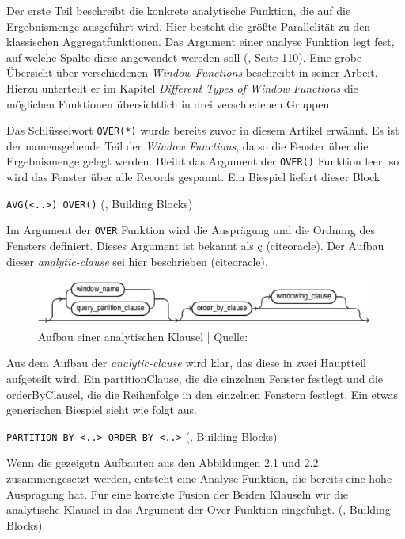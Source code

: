 Der erste Teil beschreibt die konkrete analytische Funktion, die auf die
Ergebnismenge ausgeführt wird. Hier besteht die größte Parallelität zu den klassischen
Aggregatfunktionen. Das Argument einer analyse Funktion legt fest, auf welche Spalte
diese angewendet wereden soll (\cite{schicker2017datenbanken}, Seite 110). Eine grobe
Übersicht über verschiedenen \textit{Window Functions} beschreibt
\cite{ibrahaim23} in seiner Arbeit. Hierzu unterteilt er im Kapitel \textit{Different
Types of Window Functions} die möglichen Funktionen übersichtlich in drei
verschiedenen Gruppen.

Das Schlüsselwort \texttt{OVER(*)} wurde bereits zuvor in diesem Artikel erwähnt.
Es ist der namensgebende Teil der \textit{Window Functions}, da so die Fenster
über die Ergebnismenge gelegt werden. Bleibt das Argument der \texttt{OVER()}
Funktion leer, so wird das Fenster über alle Records gespannt. Ein Biespiel
liefert dieser Block

\texttt{AVG(<..>) OVER()} (\cite{Nuijten2023}, Building Blocks)

Im Argument der \texttt{OVER} Funktion wird die Ausprägung und die Ordnung des Fensters
definiert. Dieses Argument ist bekannt als ç (cite{oracle}). Der Aufbau dieser
\textit{analytic-clause} sei hier beschrieben (cite{oracle}).

\begin{figure}[h]
	\centering
	\includegraphics[scale=0.5]{img/aufbauAnalyticClausel.jpg}
	\caption{ Aufbau einer analytischen Klausel | Quelle: \cite{oracle}}
	\label{fig:aufbauAnalytischeKlausel}
\end{figure}

Aus dem Aufbau der \textit{analytic-clause} wird klar, das diese in zwei Hauptteil
aufgeteilt wird. Ein partitionClause, die die einzelnen Fenster festlegt und die
orderByClausel, die die Reihenfolge in den einzelnen Fenstern festlegt. Ein etwas
generischen Biespiel sieht wie folgt aus.

\texttt{PARTITION BY <..> ORDER BY <..>} (\cite{Nuijten2023}, Building Blocks)

Wenn die gezeigetn Aufbauten aus den Abbildungen 2.1 und 2.2 zusammengesetzt
werden, entsteht eine Analyse-Funktion, die bereits eine hohe Ausprägung hat. Für
eine korrekte Fusion der Beiden Klauseln wir die analytische Klausel in das Argument
der Over-Funktion eingefühgt. (\cite{Nuijten2023}, Building Blocks)

